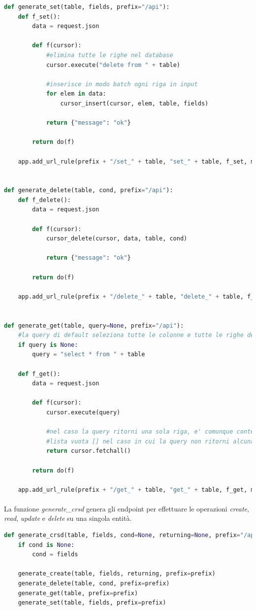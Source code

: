\documentclass[12pt,a4paper,twoside,english,italian]{book}
\begin{document}
\begin{lstlisting}[language=python, caption=Funzioni \emph{generate\_*}]
def generate_set(table, fields, prefix="/api"):
    def f_set():
        data = request.json

        def f(cursor):
            #elimina tutte le righe nel database
            cursor.execute("delete from " + table)

            #inserisce in modo batch ogni riga in input
            for elem in data:
                cursor_insert(cursor, elem, table, fields)

            return {"message": "ok"}

        return do(f)

    app.add_url_rule(prefix + "/set_" + table, "set_" + table, f_set, methods=["POST"])


def generate_delete(table, cond, prefix="/api"):
    def f_delete():
        data = request.json

        def f(cursor):
            cursor_delete(cursor, data, table, cond)

            return {"message": "ok"}

        return do(f)

    app.add_url_rule(prefix + "/delete_" + table, "delete_" + table, f_delete, methods=["DELETE"])


def generate_get(table, query=None, prefix="/api"):
    #la query di default seleziona tutte le colonne e tutte le righe della tabella
    if query is None:
        query = "select * from " + table

    def f_get():
        data = request.json

        def f(cursor):
            cursor.execute(query)

            #nel caso la query ritorni una sola riga, e' comunque contenuta in una lista unitaria [row1]
            #lista vuota [] nel caso in cui la query non ritorni alcuna riga
            return cursor.fetchall()

        return do(f)

    app.add_url_rule(prefix + "/get_" + table, "get_" + table, f_get, methods=["GET"])
\end{lstlisting}

\paragraph{} La funzione \emph{generate\_crsd} genera gli endpoint per effettuare le operazioni \emph{create}, \emph{read}, \emph{update} e \emph{delete} su una singola entità.

\newpage
\begin{lstlisting}[language=python, caption=generate\_crsd]
def generate_crsd(table, fields, cond=None, returning=None, prefix="/api"):
    if cond is None:
        cond = fields

    generate_create(table, fields, returning, prefix=prefix)
    generate_delete(table, cond, prefix=prefix)
    generate_get(table, prefix=prefix)
    generate_set(table, fields, prefix=prefix)
\end{lstlisting}
\end{document}

